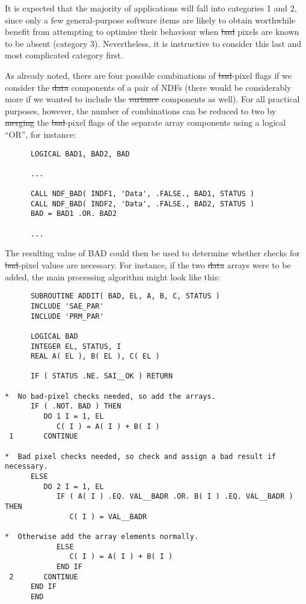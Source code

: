 It is expected that the majority of applications will fall into categories 1
and 2, since only a few general-purpose software items are likely to obtain
worthwhile benefit from attempting to optimise their behaviour when
\st{bad\/} pixels are known to be absent (category 3).  
Nevertheless, it is instructive to consider this last and most complicated
category first. 

As already noted, there are four possible combinations of \st{bad\/}-pixel
flags if we consider the \st{data\/} components of a pair of NDFs (there
would be considerably more if we wanted to include the \st{variance\/}
components as well). 
For all practical purposes, however, the number of combinations can be
reduced to two by \st{merging\/} the \st{bad\/}-pixel flags of the separate 
array components using a logical ``OR'', for instance: 

\small
\begin{verbatim}
      LOGICAL BAD1, BAD2, BAD

      ...

      CALL NDF_BAD( INDF1, 'Data', .FALSE., BAD1, STATUS )
      CALL NDF_BAD( INDF2, 'Data', .FALSE., BAD2, STATUS )
      BAD = BAD1 .OR. BAD2

      ...
\end{verbatim}
\normalsize

The resulting value of BAD could then be used to determine whether checks
for \st{bad\/}-pixel values are necessary. 
For instance, if the two \st{data\/} arrays were to be added, the main
processing algorithm might look like this: 

\small
\begin{verbatim}
      SUBROUTINE ADDIT( BAD, EL, A, B, C, STATUS )
      INCLUDE 'SAE_PAR'
      INCLUDE 'PRM_PAR'

      LOGICAL BAD
      INTEGER EL, STATUS, I
      REAL A( EL ), B( EL ), C( EL )

      IF ( STATUS .NE. SAI__OK ) RETURN

*  No bad-pixel checks needed, so add the arrays.
      IF ( .NOT. BAD ) THEN
         DO 1 I = 1, EL
            C( I ) = A( I ) + B( I )
 1       CONTINUE

*  Bad pixel checks needed, so check and assign a bad result if necessary.
      ELSE
         DO 2 I = 1, EL
            IF ( A( I ) .EQ. VAL__BADR .OR. B( I ) .EQ. VAL__BADR ) THEN
               C( I ) = VAL__BADR

*  Otherwise add the array elements normally.
            ELSE
               C( I ) = A( I ) + B( I )
            END IF
 2       CONTINUE
      END IF
      END
\end{verbatim}
\normalsize

